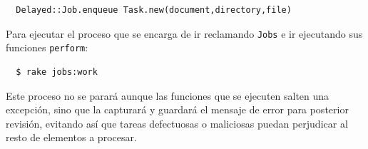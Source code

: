 \begin{verbatim}
  Delayed::Job.enqueue Task.new(document,directory,file)
\end{verbatim}

Para ejecutar el proceso que se encarga de ir reclamando \texttt{Jobs} e ir ejecutando sus funciones \texttt{perform}:

\begin{verbatim}
  $ rake jobs:work
\end{verbatim}

Este proceso no se parará aunque las funciones que se ejecuten salten una excepción, sino que la capturará y guardará el mensaje de error para posterior revisión, evitando así que tareas defectuosas o maliciosas puedan perjudicar al resto de elementos a procesar.


